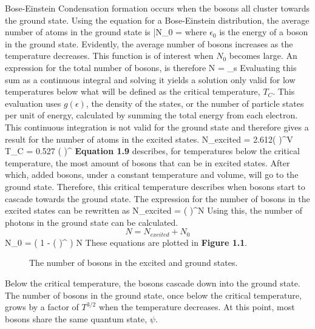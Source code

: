Bose-Einstein Condensation formation occurs when the bosons all cluster towards the ground state. Using the equation for a Bose-Einstein distribution, the average number of atoms in the ground state is 
\beq
\bar{N}_0 = 
\eeq
where $\epsilon_0$ is the energy of a boson in the ground state. Evidently, the average number of bosons increases as the temperature decreases. This function is of interest when $N_0$ becomes large. 
An expression for the total number of bosons, is therefore
\beq
N = \sum_s{}
\eeq
Evaluating this sum as a continuous integral and solving it yields a solution only valid for low temperatures below what will be defined as the critical temperature, $T_C$. This evaluation uses $g(\epsilon)$, the density of the states, or the number of particle states per unit of energy, calculated by summing the total energy from each electron. This continuous integration is not valid for the ground state and therefore gives a result for the number of atoms in the excited states\cite{foot}.
\beq
N_{excited} = 2.612\left(  \right)^{}V
\eeq
\beq
T_C = 0.527 \left(  \right)^
\eeq
\textbf{Equation 1.9} describes, for temperatures below the critical temperature, the most amount of bosons that can be in excited states. After which, added bosons, under a constant temperature and volume, will go to the ground state. Therefore, this critical temperature describes when bosons start to cascade towards the ground state. The expression for the number of bosons in the excited states can be rewritten as 
\beq
N_{excited} = \left(  \right)^N
\eeq
Using this, the number of photons in the ground state can be calculated.
$$N = N_{excited} + N_0$$
\beq 
N_0 = \left( 1 - \left(  \right)^ \right) N
\eeq 
These equations are plotted in \textbf{Figure 1.1}.
\begin{figure}[h]
\begin{center}
\end{center}
\caption{The number of bosons in the excited and ground states.\cite{thermal} }
\end{figure}

Below the critical temperature, the bosons cascade down into the ground state. The number of bosons in the ground state, once below the critical temperature, grows by a factor of $T^{3/2}$ when the temperature decreases. At this point, most bosons share the same quantum state, $\psi$.


